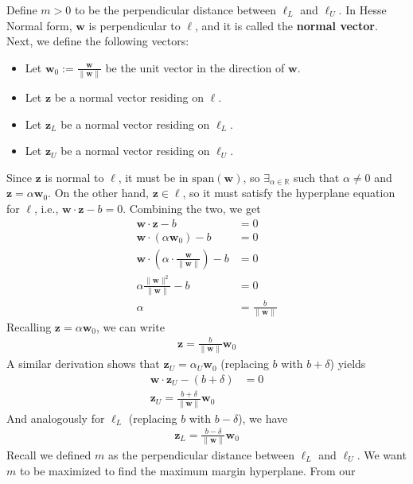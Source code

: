 \documentclass[12pt, a4paper]{article}
\theoremstyle{definition}
\begin{document}
	Define $m>0$ to be the perpendicular distance between $\ell_L$ and $\ell_U$.
	In Hesse Normal form, $\mathbf{w}$ is perpendicular to $\ell$, and it is called the
	\textbf{normal vector}. Next, we define the following vectors:
	\begin{itemize}
		\item Let $\mathbf{w}_0:=\frac{\mathbf{w}}{\|\mathbf{w}\|}$ be the unit vector in the direction
		of $\mathbf{w}$.
		\item Let $\mathbf{z}$ be a normal vector residing on $\ell$.
		\item Let $\mathbf{z}_L$ be a normal vector residing on $\ell_L$.
		\item Let $\mathbf{z}_U$ be a normal vector residing on $\ell_U$.
	\end{itemize}
	Since $\mathbf{z}$ is normal to $\ell$, it must be in $\text{span}(\mathbf{w})$,
	so $\exists_{\alpha\in\mathbb{R}}$ such that $\alpha\neq0$ and $\mathbf{z}=\alpha \mathbf{w}_0$.
	On the other hand, $\mathbf{z}\in \ell$, so it must satisfy the hyperplane equation
	for $\ell$, i.e., $\mathbf{w}\cdot \mathbf{z}-b=0$. Combining the two, we get
	\begin{align*}
		\mathbf{w}\cdot \mathbf{z}-b&=0\\
		\mathbf{w}\cdot (\alpha \mathbf{w}_0)-b&=0\\
		\mathbf{w}\cdot \left(\alpha\cdot \frac{\mathbf{w}}{\|\mathbf{w}\|}\right)-b&=0\\
		\alpha \frac{\|\mathbf{w}\|^2}{\|\mathbf{w}\|}-b&=0\\
		\alpha &= \frac{b}{\|\mathbf{w}\|}
	\end{align*}
	Recalling $\mathbf{z}=\alpha \mathbf{w}_0$, we can write
	\begin{align*}
		\mathbf{z}=\frac{b}{\|\mathbf{w}\|}\mathbf{w}_0
	\end{align*}
	A similar derivation shows that $\mathbf{z}_U=\alpha_U\mathbf{w}_0$ (replacing
	$b$ with $b+\delta$) yields
	\begin{align*}
		\mathbf{w}\cdot \mathbf{z}_U-(b+\delta)&=0\\
		\mathbf{z}_U=\frac{b+\delta}{\|\mathbf{w}\|}\mathbf{w}_0
	\end{align*}
	And analogously for $\ell_L$ (replacing $b$ with $b-\delta$), we have
	\begin{align*}
		\mathbf{z}_L =\frac{b-\delta}{\|\mathbf{w}\|}\mathbf{w}_0
	\end{align*}
	Recall we defined $m$ as the perpendicular distance between $\ell_L$ and $\ell_U$.
	We want $m$ to be maximized to find the maximum margin hyperplane. From our
\end{document}
